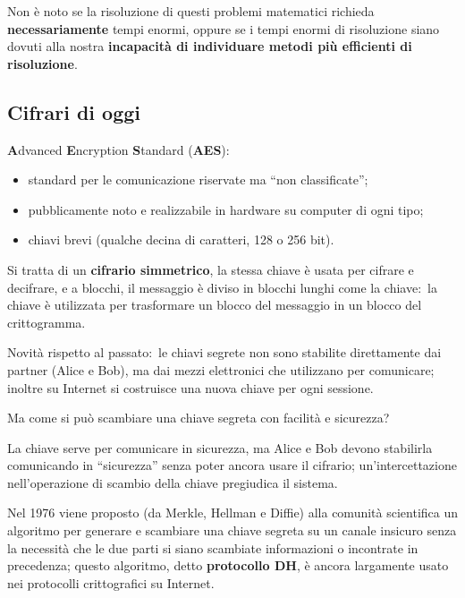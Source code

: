 Non è noto se la risoluzione di questi problemi matematici richieda \textbf{necessariamente} tempi enormi, oppure se i tempi enormi di risoluzione siano dovuti alla nostra \textbf{incapacità di individuare metodi più efficienti di risoluzione}.\

\subsection{Cifrari di oggi}

\textbf{A}dvanced \textbf{E}ncryption \textbf{S}tandard (\textbf{AES}):

\begin{itemize}
    \item standard per le comunicazione riservate ma ``non classificate'';
    \item pubblicamente noto e realizzabile in hardware su computer di ogni tipo;
    \item chiavi brevi (qualche decina di caratteri, 128 o 256 bit).
\end{itemize}

\noindent Si tratta di un \textbf{cifrario simmetrico}, la stessa chiave è usata per cifrare e decifrare, e a blocchi, il messaggio è diviso in blocchi lunghi come la chiave:\ la chiave è utilizzata per trasformare un blocco del messaggio in un blocco del crittogramma.\

Novità rispetto al passato:\ le chiavi segrete non sono stabilite direttamente dai partner (Alice e Bob), ma dai mezzi elettronici che utilizzano per comunicare; inoltre su Internet si costruisce una nuova chiave per ogni sessione.\

\begin{flushleft}
    Ma come si può scambiare una chiave segreta con facilità e sicurezza?
\end{flushleft}

\noindent La chiave serve per comunicare in sicurezza, ma Alice e Bob devono stabilirla comunicando in ``sicurezza'' senza poter ancora usare il cifrario; un'intercettazione nell'operazione di scambio della chiave pregiudica il sistema.\

Nel 1976 viene proposto (da Merkle, Hellman e Diffie) alla comunità scientifica un algoritmo per generare e scambiare una chiave segreta su un canale insicuro senza la necessità che le due parti si siano scambiate informazioni o incontrate in precedenza; questo algoritmo, detto \textbf{protocollo DH}, è ancora largamente usato nei protocolli crittografici su Internet.\

